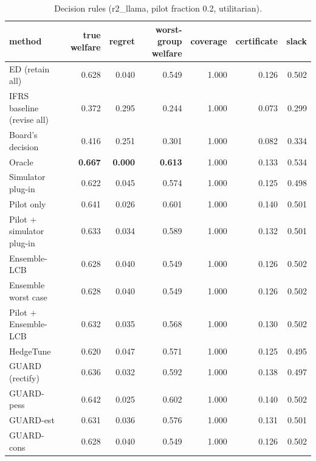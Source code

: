 \begin{table}[t]
\centering
\small
\begin{tabular}{lrrrrrr}
\toprule
method & true welfare & regret & worst-group welfare & coverage & certificate & slack \\
\midrule
ED (retain all) & 0.628 & 0.040 & 0.549 & 1.000 & 0.126 & 0.502 \\
IFRS baseline (revise all) & 0.372 & 0.295 & 0.244 & 1.000 & 0.073 & 0.299 \\
Board's decision & 0.416 & 0.251 & 0.301 & 1.000 & 0.082 & 0.334 \\
Oracle & \textbf{0.667} & \textbf{0.000} & \textbf{0.613} & 1.000 & 0.133 & 0.534 \\
Simulator plug-in & 0.622 & 0.045 & 0.574 & 1.000 & 0.125 & 0.498 \\
Pilot only & 0.641 & 0.026 & 0.601 & 1.000 & 0.140 & 0.501 \\
Pilot + simulator plug-in & 0.633 & 0.034 & 0.589 & 1.000 & 0.132 & 0.501 \\
Ensemble-LCB & 0.628 & 0.040 & 0.549 & 1.000 & 0.126 & 0.502 \\
Ensemble worst case & 0.628 & 0.040 & 0.549 & 1.000 & 0.126 & 0.502 \\
Pilot + Ensemble-LCB & 0.632 & 0.035 & 0.568 & 1.000 & 0.130 & 0.502 \\
HedgeTune & 0.620 & 0.047 & 0.571 & 1.000 & 0.125 & 0.495 \\
GUARD (rectify) & 0.636 & 0.032 & 0.592 & 1.000 & 0.138 & 0.497 \\
GUARD-pess & 0.642 & 0.025 & 0.602 & 1.000 & 0.140 & 0.502 \\
GUARD-est & 0.631 & 0.036 & 0.576 & 1.000 & 0.131 & 0.501 \\
GUARD-cons & 0.628 & 0.040 & 0.549 & 1.000 & 0.126 & 0.502 \\
\bottomrule
\end{tabular}
\caption{Decision rules (r2\_llama, pilot fraction 0.2, utilitarian).}
\label{tab:methods-utilitarian}
\end{table}
